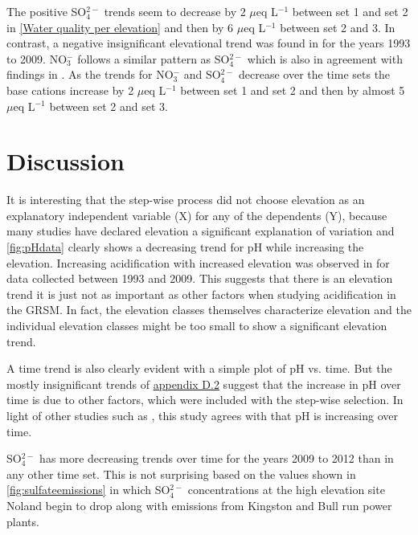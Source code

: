 The positive SO$_4^{2-}$ trends seem to decrease by 2 $\mu$eq L$^{-1}$ between set 1 and set 2 in \autoref{Water quality per elevation} and then by 6  $\mu$eq L$^{-1}$ between set 2 and 3.  
In contrast, a negative insignificant elevational trend was found in \citet{cai2013} for the years 1993 to 2009.  
NO$_3^-$ follows a similar pattern as SO$_4^{2-}$ which is also in agreement with findings in \citet{weathers2006}.  
As the trends for  NO$_3^-$ and SO$_4^{2-}$ decrease over the time sets the base cations increase by 2 $\mu$eq L$^{-1}$ between set 1 and set 2 and then by almost 5 $\mu$eq L$^{-1}$ between set 2 and set 3.

\section{Discussion}%

It is interesting that the step-wise process did not choose elevation as an explanatory independent variable (X) for any of the dependents (Y), because many studies have declared elevation a significant explanation of variation and \autoref{fig:pHdata} clearly shows a decreasing trend for pH while increasing the elevation. 
Increasing acidification with increased elevation was observed in \citet{cai2013} for data collected between 1993 and 2009.
This suggests that there is an elevation trend it is just not as important as other factors when studying acidification in the GRSM.
In fact, the elevation classes themselves characterize elevation and the individual elevation classes might be too small to show a significant elevation trend.  

A time trend is also clearly evident with a simple plot of pH vs. time.
But the mostly insignificant trends of  \hyperref[app:time vars]{appendix D.2} suggest that the increase in pH over time is due to other factors, which were included with the step-wise selection. 
In light of other studies such as \citet{robinson2008ph}, this study agrees with \citet{cai2013} that pH is increasing over time.

SO$_4^{2-}$ has more decreasing trends over time for the years 2009 to 2012 than in any other time set.
This is not surprising based on the values shown in \autoref{fig:sulfateemissions} in which SO$_4^{2-}$ concentrations at the high elevation site Noland begin to drop along with emissions from Kingston and Bull run power plants.  


